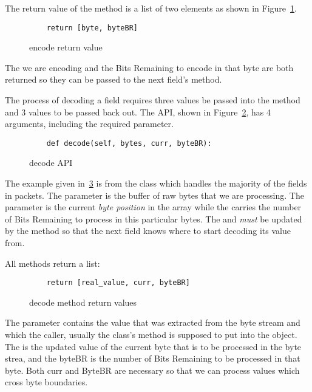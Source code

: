 \documentclass[11pt]{article}
\begin{document}
The return value of the  method is a list of two
elements as shown in Figure~\ref{fig:encode_return_value}.

\begin{figure}
  \begin{lstlisting}
    return [byte, byteBR]
  \end{lstlisting}
  \caption{encode return value}
  \label{fig:encode_return_value}
\end{figure}

The  we are encoding and the  Bits
Remaining to encode in that byte are both returned so they can be
passed to the next field's  method.

The process of decoding a field requires three values be passed into
the  method and 3 values to be passed back out.  The
 API, shown in Figure~\ref{fig:decode_API}, has 4
arguments, including the required  parameter.

\begin{figure}
  \begin{lstlisting}
    def decode(self, bytes, curr, byteBR):
  \end{lstlisting}
  \caption{decode API}
  \label{fig:decode_API}
\end{figure}

The example given in~\ref{fig:decode_return_value} is from the
 class which handles the majority of the fields in
packets.  The  parameter is the buffer of raw bytes
that we are processing.  The  parameter is the current
\emph{byte position} in the  array while
the  carries the number of Bits Remaining to process
in this particular bytes.  The  and 
\emph{must} be updated by the  method so that the next
field knows where to start decoding its value from.

All  methods return a list:

\begin{figure}
  \begin{lstlisting}
    return [real_value, curr, byteBR]
  \end{lstlisting}
  \caption{decode method return values}
  \label{fig:decode_return_value}
\end{figure}

The  parameter contains the value that
was extracted from the byte stream and which the caller, usually the
 class's  method is supposed to put into
the  object.  The  is the updated value
of the current byte that is to be processed in the byte strea, and the
byteBR is the number of Bits Remaining to be processed in that byte.
Both curr and ByteBR are necessary so that we can process values which
cross byte boundaries.
\end{document}
